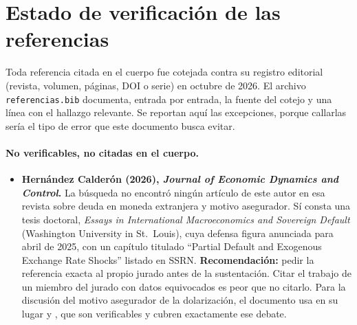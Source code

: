 \documentclass[11pt]{article}
\theoremstyle{definition}
\begin{document}
\section{Estado de verificaci\'on de las referencias}\label{sec:verificacion}

Toda referencia citada en el cuerpo fue cotejada contra su registro editorial
(revista, volumen, p\'aginas, DOI o serie) en octubre de 2026. El archivo
\texttt{referencias.bib} documenta, entrada por entrada, la fuente del cotejo y
una l\'inea con el hallazgo relevante. Se reportan aqu\'i las excepciones, porque
callarlas ser\'ia el tipo de error que este documento busca evitar.

\paragraph{No verificables, no citadas en el cuerpo.}
\begin{itemize}[leftmargin=*,itemsep=2pt]
\item \textbf{Hern\'andez Calder\'on (2026), \emph{Journal of Economic Dynamics and
Control}.} La b\'usqueda no encontr\'o ning\'un art\'iculo de este autor en esa revista
sobre deuda en moneda extranjera y motivo asegurador. S\'i consta una tesis
doctoral, \emph{Essays in International Macroeconomics and Sovereign Default}
(Washington University in St.\ Louis), cuya defensa figura anunciada para abril
de 2025, con un cap\'itulo titulado ``Partial Default and Exogenous Exchange Rate
Shocks'' listado en SSRN. \textbf{Recomendaci\'on:} pedir la referencia exacta al
propio jurado antes de la sustentaci\'on. Citar el trabajo de un miembro del
jurado con datos equivocados es peor que no citarlo. Para la discusi\'on del
motivo asegurador de la dolarizaci\'on, el documento usa en su lugar
\citet{bocolalorenzoni2020} y \citet{dalgic2024}, que son verificables y cubren
exactamente ese debate.
\end{itemize}
\end{document}
